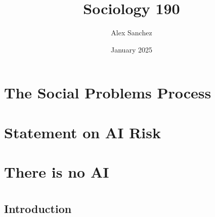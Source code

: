 \documentclass[openanyt]{book}
\title{Sociology 190}
\author{Alex Sanchez}
\date{January 2025}
\begin{document}
\maketitle

\chapter{The Social Problems Process}

\chapter{Statement on AI Risk}

\chapter{There is no AI}

\chapter{}

\section{Introduction}
\end{document}
